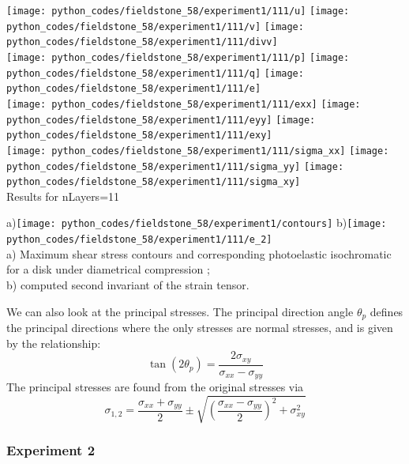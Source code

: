 \newpage
\begin{center}
\texttt{[image: python\_codes/fieldstone\_58/experiment1/111/u]}
\texttt{[image: python\_codes/fieldstone\_58/experiment1/111/v]}
\texttt{[image: python\_codes/fieldstone\_58/experiment1/111/divv]}\\
\texttt{[image: python\_codes/fieldstone\_58/experiment1/111/p]}
\texttt{[image: python\_codes/fieldstone\_58/experiment1/111/q]}
\texttt{[image: python\_codes/fieldstone\_58/experiment1/111/e]}\\
\texttt{[image: python\_codes/fieldstone\_58/experiment1/111/exx]}
\texttt{[image: python\_codes/fieldstone\_58/experiment1/111/eyy]}
\texttt{[image: python\_codes/fieldstone\_58/experiment1/111/exy]}\\
\texttt{[image: python\_codes/fieldstone\_58/experiment1/111/sigma\_xx]}
\texttt{[image: python\_codes/fieldstone\_58/experiment1/111/sigma\_yy]}
\texttt{[image: python\_codes/fieldstone\_58/experiment1/111/sigma\_xy]}\\
{\captionfont Results for nLayers=11}
\end{center}

\newpage

\begin{center}
a)\texttt{[image: python\_codes/fieldstone\_58/experiment1/contours]}
b)\texttt{[image: python\_codes/fieldstone\_58/experiment1/111/e\_2]}\\
{\captionfont 
a) Maximum shear stress contours and corresponding photoelastic isochromatic 
for a disk under diametrical compression \cite{sadd14};\\
b) computed second invariant of the strain tensor.}
\end{center}


We can also look at the principal stresses.
The principal direction angle $\theta_p$ defines the principal
directions where the only stresses are normal stresses, and 
is given by the relationship:
\[
\tan (2\theta_p) =  \frac{2 \sigma_{xy}}{\sigma_{xx} -\sigma_{yy}}
\]
The principal stresses are found from the original stresses via
 \[
\sigma_{1,2}=\frac{\sigma_{xx}+\sigma_{yy}}{2} \pm \sqrt{  \left(\frac{\sigma_{xx}-\sigma_{yy}}{2}\right)^2 +\sigma_{xy}^2 }
 \]



\newpage
\subsubsection*{Experiment 2}


